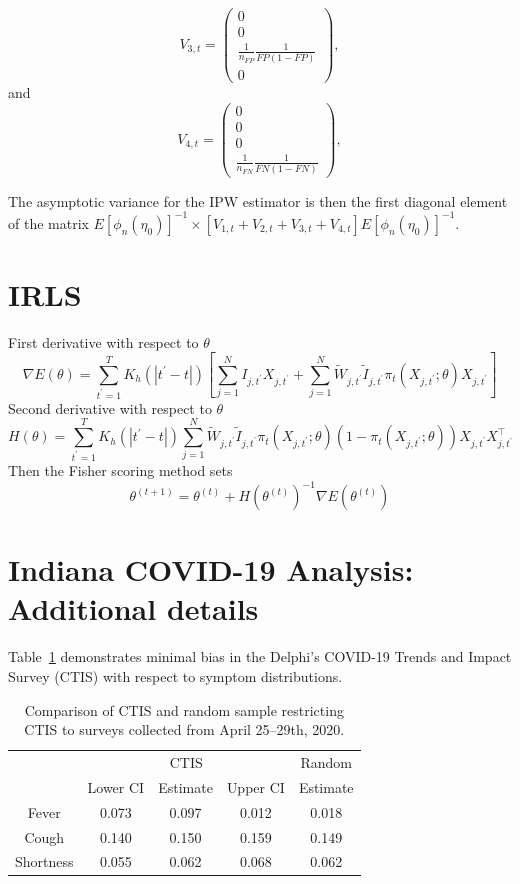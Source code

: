 \documentclass[12pt]{amsart}
\numberwithin{equation}{section}
\theoremstyle{plain}
\begin{document}
$$
V_{3,t} = \left( \begin{array}{c}
0 \\
0 \\
\frac{1}{n_{FP}} \frac{1}{FP(1-FP)} \\
0
\end{array}
\right),
$$
and
$$
V_{4,t} = \left( \begin{array}{c}
0 \\
0 \\
0 \\
\frac{1}{n_{FN}} \frac{1}{FN(1-FN)}
\end{array}
\right),
$$

The asymptotic variance for the IPW estimator is then the first diagonal element of the matrix $E \left[ \phi_n (\eta_0) \right]^{-1} \times \left[ V_{1,t} + V_{2,t} + V_{3,t} + V_{4,t} \right] E \left[ \phi_n (\eta_0) \right]^{-1}$.
\section{IRLS}
\label{app:irls}
First derivative with respect to $\theta$
$$
\nabla E(\theta) = \sum_{t^\prime=1}^T K_h(|t^\prime - t|) \left[ \sum_{j=1}^N I_{j,t^\prime} X_{j,t^\prime} + \sum_{j=1}^N \tilde W_{j,t^\prime} \tilde I_{j,t^\prime} \pi_t (X_{j,t^\prime}; \theta) X_{j,t^\prime} \right]
$$
Second derivative with respect to $\theta$
$$
H(\theta) = \sum_{t^\prime=1}^T K_h(|t^\prime - t|) \sum_{j=1}^N \tilde W_{j,t^\prime} \tilde I_{j,t^\prime} \pi_t (X_{j,t^\prime}; \theta) \left( 1- \pi_t (X_{j,t^\prime}; \theta) \right) X_{j,t^\prime} X_{j,t^\prime}^\top
$$
Then the Fisher scoring method sets
$$
\theta^{(t+1)} = \theta^{(t)} + H \left(\theta^{(t)} \right)^{-1} \nabla E \left(\theta^{(t)} \right)
$$

\section{Indiana COVID-19 Analysis: Additional details}
\label{app:in_add_details}

Table~\ref{tab:comparison} demonstrates minimal bias in the Delphi’s COVID-19 Trends and Impact Survey (CTIS) with respect to symptom distributions.

 \begin{table}[!th]
 \centering
 \begin{tabular}{c | c c c | c}
 & \multicolumn{3}{c}{CTIS} & Random \\ \cline{2-4}
 & Lower CI & Estimate & Upper CI & Estimate \\ \hline
 Fever &  0.073 & 0.097 & 0.012 & 0.018 \\
 Cough &  0.140 & 0.150 & 0.159 & 0.149 \\
 Shortness & 0.055 & 0.062 & 0.068 & 0.062 \\ \hline
 \end{tabular}
 \caption{Comparison of CTIS and random sample restricting CTIS to surveys collected from April 25--29th, 2020.}
 \label{tab:comparison}
 \end{table}
\end{document}
